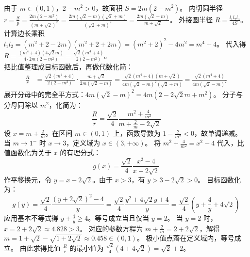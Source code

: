 \begin{solution}
\begin{align*}
\end{align*}
由于 $m \in (0, 1)$，$2-m^2 > 0$，故面积 $S = 2m(2-m^2)$。
内切圆半径 $r = \frac{S}{p} = \frac{2m(2-m^2)}{(m+\sqrt{2})^2} = \frac{2m(\sqrt{2}-m)(\sqrt{2}+m)}{(\sqrt{2}+m)^2} = \frac{2m(\sqrt{2}-m)}{m+\sqrt{2}}$。
外接圆半径 $R = \frac{l_1 l_2 l_3}{4S}$。计算边长乘积 $l_1 l_2 = (m^2+2-2m)(m^2+2+2m) = (m^2+2)^2 - 4m^2 = m^4 + 4$。
代入得 $R = \frac{(m^4+4)(4\sqrt{2}m)}{4 \cdot 2m(2-m^2)} = \frac{\sqrt{2}(m^4+4)}{2(2-m^2)}$。\\
把比值整理成目标函数后，再做代数化简：
\begin{align*}
\frac{R}{r} &= \frac{\sqrt{2}(m^4+4)}{2(2-m^2)} \cdot \frac{m+\sqrt{2}}{2m(\sqrt{2}-m)} = \frac{\sqrt{2}(m^4+4)(m+\sqrt{2})}{4m(\sqrt{2}-m)^2(\sqrt{2}+m)} = \frac{\sqrt{2}(m^4+4)}{4m(\sqrt{2}-m)^2}
\end{align*}
展开分母中的完全平方式：$4m(\sqrt{2}-m)^2 = 4m(2 - 2\sqrt{2}m + m^2)$。
分子与分母同除以 $m^2$，化简为：
\[ \frac{R}{r} = \frac{\sqrt{2}}{4} \frac{m^2 + \frac{4}{m^2}}{m + \frac{2}{m} - 2\sqrt{2}} \]
设 $x = m + \frac{2}{m}$。在区间 $m \in (0, 1)$ 上，函数导数为 $1 - \frac{2}{m^2} < 0$，故单调递减。
当 $m \to 1^-$ 时 $x \to 3$，定义域为 $x \in (3, +\infty)$。
将 $m^2 + \frac{4}{m^2} = x^2 - 4$ 代入，比值函数化为关于 $x$ 的有理分式：
\[ g(x) = \frac{\sqrt{2}}{4} \frac{x^2 - 4}{x - 2\sqrt{2}} \]
作平移换元，令 $y = x - 2\sqrt{2}$。由于 $x > 3$，有 $y > 3 - 2\sqrt{2} > 0$。
目标函数化为：
\[ g(y) = \frac{\sqrt{2}}{4} \frac{(y+2\sqrt{2})^2 - 4}{y} = \frac{\sqrt{2}}{4} \frac{y^2 + 4\sqrt{2}y + 4}{y} = \frac{\sqrt{2}}{4} \left( y + \frac{4}{y} + 4\sqrt{2} \right) \]
应用基本不等式得 $y + \frac{4}{y} \ge 4$。等号成立当且仅当 $y = 2$。
当 $y = 2$ 时，$x = 2 + 2\sqrt{2} \approx 4.828 > 3$。
对应的参数方程为 $m + \frac{2}{m} = 2 + 2\sqrt{2}$，解得 $m = 1 + \sqrt{2} - \sqrt{1 + 2\sqrt{2}} \approx 0.458 \in (0, 1)$。
极小值点落在定义域内，等号成立。
由此求得比值 $\frac{R}{r}$ 的最小值为 $\frac{\sqrt{2}}{4} (4 + 4\sqrt{2}) = \sqrt{2} + 2$。
\end{solution}



